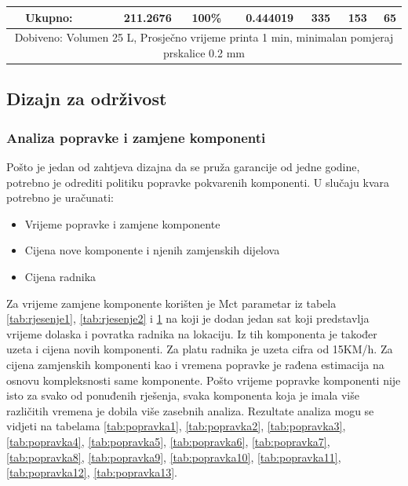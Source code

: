 \documentclass[12pt]{article}
\begin{document}
\begin{landscape}
\begin{table}[htbp]
\begin{tabular}{ccccccccc}
    \midrule
          & \multicolumn{1}{l}{Ukupno:} &       & \multicolumn{1}{r}{211.2676} & \multicolumn{1}{r}{100\%} & \multicolumn{1}{r}{0.444019} & \multicolumn{1}{r}{335} & \multicolumn{1}{r}{153} & \multicolumn{1}{r}{65} \\
    \midrule
    \multicolumn{9}{c}{Dobiveno: Volumen 25 L, Prosječno vrijeme printa 1 min, minimalan pomjeraj prskalice 0.2 mm} \\
    \bottomrule
    \end{tabular}%
  \label{tab:rjesenje3}%
\end{table}%

\end{landscape}
\subsection{Dizajn za održivost}
\subsubsection{Analiza popravke i zamjene komponenti}

Pošto je jedan od zahtjeva dizajna da se pruža garancije od jedne godine, potrebno je odrediti politiku popravke pokvarenih komponenti. U slučaju kvara potrebno je uračunati:
\begin{itemize}
\item Vrijeme popravke i zamjene komponente
\item Cijena nove komponente i njenih zamjenskih dijelova
\item Cijena radnika
\end{itemize}

Za vrijeme zamjene komponente korišten je Mct parametar iz tabela \ref{tab:rjesenje1}, \ref{tab:rjesenje2} i \ref{tab:rjesenje3} na koji je dodan jedan sat koji predstavlja vrijeme dolaska i povratka radnika na lokaciju. Iz tih komponenta je također uzeta i cijena novih komponenti. Za platu radnika je uzeta cifra od 15KM/h. Za cijena zamjenskih komponenti kao i vremena popravke je rađena estimacija na osnovu kompleksnosti same komponente. Pošto vrijeme popravke komponenti nije isto za svako od ponuđenih rješenja, svaka komponenta koja je imala više različitih vremena je dobila više zasebnih analiza. Rezultate analiza mogu se vidjeti na tabelama \ref{tab:popravka1}, \ref{tab:popravka2}, \ref{tab:popravka3}, \ref{tab:popravka4}, \ref{tab:popravka5}, \ref{tab:popravka6}, \ref{tab:popravka7}, \ref{tab:popravka8}, \ref{tab:popravka9}, \ref{tab:popravka10}, \ref{tab:popravka11}, \ref{tab:popravka12}, \ref{tab:popravka13}.
\end{document}
